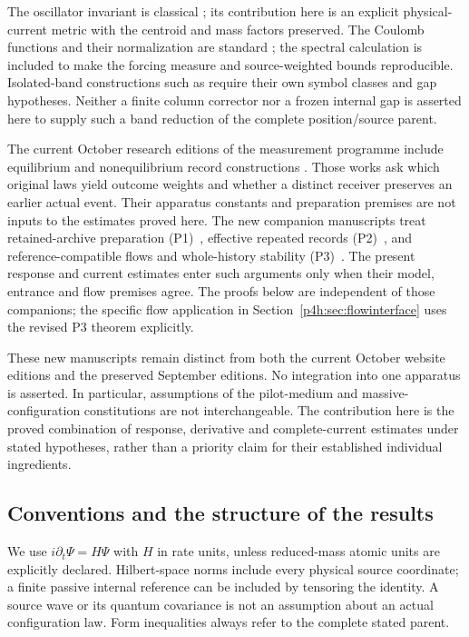 \documentclass[11pt]{article}
\numberwithin{equation}{section}
\theoremstyle{definition}
\theoremstyle{remark}
\begin{document}
The oscillator invariant is classical
\cite{Lewis1967,LewisRiesenfeld1969}; its contribution here is an explicit
physical-current metric with the centroid and mass factors preserved.
The Coulomb functions and their normalization are standard
\cite{DLMFCoulomb}; the spectral calculation is included to make the
forcing measure and source-weighted bounds reproducible. Isolated-band
constructions such as \cite{PanatiSpohnTeufel2003} require their own
symbol classes and gap hypotheses. Neither a finite column corrector
nor a frozen internal gap is asserted here to supply such a band
reduction of the complete position/source parent.

The current October research editions of the measurement programme
include equilibrium and nonequilibrium record constructions
\cite{RodgersEquilibrium,RodgersNonequilibrium}. Those works ask which
original laws yield outcome weights and whether a distinct receiver
preserves an earlier actual event. Their apparatus constants and
preparation premises are not inputs to the estimates proved here.
The new companion manuscripts treat retained-archive preparation
(P1)~\cite{RodgersP1}, effective repeated records (P2)~\cite{RodgersP2},
and reference-compatible flows and whole-history stability
(P3)~\cite{RodgersP3}. The present response and current estimates enter
such arguments only when their model, entrance and flow premises
agree. The proofs below are independent of those companions; the
specific flow application in Section~\ref{p4h:sec:flowinterface} uses
the revised P3 theorem explicitly.

These new manuscripts remain distinct from both the current October
website editions and the preserved September editions. No integration
into one apparatus is asserted. In particular, assumptions of the
pilot-medium and massive-configuration constitutions are not
interchangeable. The contribution here is the proved combination of
response, derivative and complete-current estimates under stated
hypotheses, rather than a priority claim for their established
individual ingredients.

\subsection{Conventions and the structure of the results}

We use $i\partial_t\Psi=H\Psi$ with $H$ in rate units, unless reduced-mass
atomic units are explicitly declared. Hilbert-space norms include every
physical source coordinate; a finite passive internal reference can be
included by tensoring the identity. A source wave or its quantum
covariance is not an assumption about an actual configuration law.
Form inequalities always refer to the complete stated parent.
\end{document}
